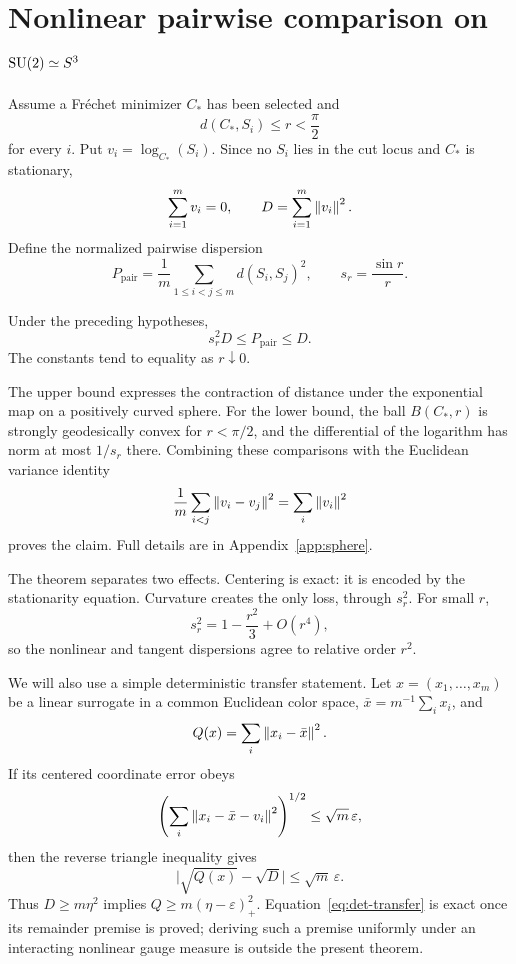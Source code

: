 \section{Nonlinear pairwise comparison on \texorpdfstring{$\mathrm{SU}(2)\simeq S^3$}{SU(2) = S3}}
\label{sec:nonlinear}

Assume a Fr\'echet minimizer $C_*$ has been selected and
\[
  d(C_*,S_i)\le r<\frac\pi2
\]
for every $i$.  Put $v_i=\log_{C_*}(S_i)$.  Since no $S_i$ lies in the cut
locus and $C_*$ is stationary,
\[
  \sum_{i=1}^m v_i=0,
  \qquad
  D=\sum_{i=1}^m\left\lVert v_i\right\rVert^2.
\]
Define the normalized pairwise dispersion
\[
  P_{\mathrm{pair}}=\frac1m\sum_{1\le i<j\le m}d(S_i,S_j)^2,
  \qquad s_r=\frac{\sin r}{r}.
\]

\begin{theorem}
\label{thm:sphere}
Under the preceding hypotheses,
\[
  s_r^2D\le P_{\mathrm{pair}}\le D.
\]
The constants tend to equality as $r\downarrow0$.
\end{theorem}

The upper bound expresses the contraction of distance under the exponential
map on a positively curved sphere.  For the lower bound, the ball
$B(C_*,r)$ is strongly geodesically convex for $r<\pi/2$, and the differential
of the logarithm has norm at most $1/s_r$ there.  Combining these comparisons
with the Euclidean variance identity
\[
 \frac1m\sum_{i<j}\left\lVert v_i-v_j\right\rVert^2
 =\sum_i\left\lVert v_i\right\rVert^2
\]
proves the claim.  Full details are in Appendix~\ref{app:sphere}.

The theorem separates two effects.  Centering is exact: it is encoded by the
stationarity equation.  Curvature creates the only loss, through $s_r^2$.
For small $r$,
\[
 s_r^2=1-\frac{r^2}{3}+O(r^4),
\]
so the nonlinear and tangent dispersions agree to relative order $r^2$.

We will also use a simple deterministic transfer statement.  Let
$x=(x_1,\ldots,x_m)$ be a linear surrogate in a common Euclidean color space,
$\bar x=m^{-1}\sum_i x_i$, and
\[
 Q(x)=\sum_i\left\lVert x_i-\bar x\right\rVert^2.
\]
If its centered coordinate error obeys
\[
 \left(\sum_i\left\lVert x_i-\bar x-v_i\right\rVert^2\right)^{1/2}\le\sqrt m\,\varepsilon,
\]
then the reverse triangle inequality gives
\begin{equation}
\label{eq:det-transfer}
  \bigl|\sqrt{Q(x)}-\sqrt D\bigr|\le\sqrt m\,\varepsilon.
\end{equation}
Thus $D\ge m\eta^2$ implies
$Q\ge m(\eta-\varepsilon)_+^2$.  Equation~\eqref{eq:det-transfer} is exact
once its remainder premise is proved; deriving such a premise uniformly under
an interacting nonlinear gauge measure is outside the present theorem.
